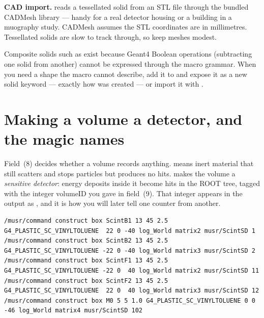 \begin{newin}
\textbf{CAD import.}  reads a tessellated solid from an STL file through the bundled CADMesh library --- handy for a real detector housing or a building in a muography study. CADMesh assumes the STL coordinates are in millimetres. Tessellated solids are slow to track through, so keep meshes modest.
\end{newin}

\begin{hood}
Composite solids such as  exist because Geant4 Boolean operations (subtracting one solid from another) cannot be expressed through the macro grammar. When you need a shape the macro cannot describe, add it to  and expose it as a new solid keyword --- exactly how  was created --- or import it with .
\end{hood}

\section{Making a volume a detector, and the magic names}
\label{sec:magic}
Field~(8) decides whether a volume records anything.  means inert material that still scatters and stops particles but produces no hits.  makes the volume a \emph{sensitive detector}: energy deposits inside it become hits in the ROOT tree, tagged with the integer volumeID you gave in field~(9). That integer appears in the output as , and it is how you will later tell one counter from another.

\begin{lstlisting}[style=mac,caption={Five sensitive counters, distinguished only by their volumeID (from \texttt{201.mac})}]
/musr/command construct box ScintB1 13 45 2.5 G4_PLASTIC_SC_VINYLTOLUENE  22 0 -40 log_World matrix2 musr/ScintSD 1
/musr/command construct box ScintB2 13 45 2.5 G4_PLASTIC_SC_VINYLTOLUENE -22 0 -40 log_World matrix3 musr/ScintSD 2
/musr/command construct box ScintF1 13 45 2.5 G4_PLASTIC_SC_VINYLTOLUENE -22 0  40 log_World matrix2 musr/ScintSD 11
/musr/command construct box ScintF2 13 45 2.5 G4_PLASTIC_SC_VINYLTOLUENE  22 0  40 log_World matrix3 musr/ScintSD 12
/musr/command construct box M0 5 5 1.0 G4_PLASTIC_SC_VINYLTOLUENE 0 0 -46 log_World matrix4 musr/ScintSD 102
\end{lstlisting}

